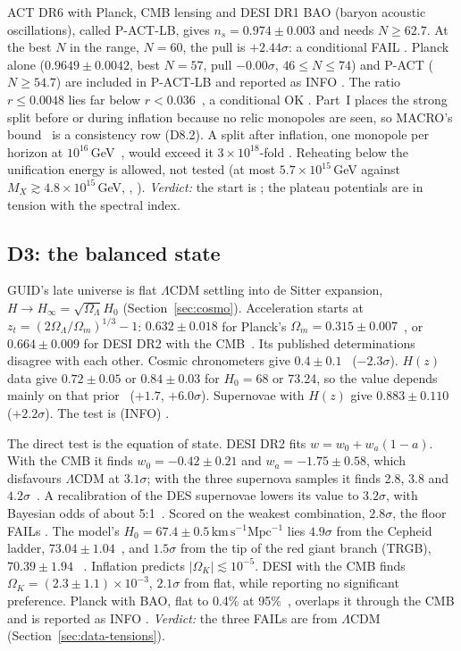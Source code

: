 ACT DR6 with Planck, CMB lensing and DESI DR1 BAO (baryon acoustic oscillations), called P-ACT-LB, gives $n_s=0.974\pm0.003$ and needs
$N\ge62.7$. At the best $N$ in the range, $N=60$, the pull is $+2.44\sigma$: a conditional FAIL . Planck alone ($0.9649\pm0.0042$,
best $N=57$, pull $-0.00\sigma$, $46\le N\le74$) and P-ACT ($N\ge54.7$) are included in P-ACT-LB and reported as INFO .
The ratio $r\le0.0048$ lies far below $r<0.036$~\cite{bk18}, a conditional OK . Part~I places the strong split before or
during inflation because no relic monopoles are seen, so MACRO's bound~\cite{macro} is a consistency row (D8.2). A split after inflation, one
monopole per horizon at $10^{16}$\,GeV~\cite{preskill}, would exceed it $3\times10^{18}$-fold . Reheating below the
unification energy is allowed, not tested (at most $5.7\times10^{15}$\,GeV against $M_X\gtrsim4.8\times10^{15}$\,GeV, ,
). \emph{Verdict:} the start is ; the plateau potentials are in tension with the spectral index.

\subsection{D3: the balanced state}\label{sec:data-cosmo}

GUID's late universe is flat $\Lambda$CDM settling into de Sitter expansion, $H\to H_\infty=\sqrt{\Omega_\Lambda}H_0$ (Section~\ref{sec:cosmo}).
Acceleration starts at $z_t=(2\Omega_\Lambda/\Omega_m)^{1/3}-1$: $0.632\pm0.018$ for Planck's $\Omega_m=0.315\pm0.007$~\cite{planck18}, or
$0.664\pm0.009$ for DESI DR2 with the CMB~\cite{desi2}. Its published determinations disagree with each other. Cosmic
chronometers give $0.4\pm0.1$~\cite{moresco2016} ($-2.3\sigma$). $H(z)$ data give $0.72\pm0.05$ or $0.84\pm0.03$ for $H_0=68$ or 73.24, so
the value depends mainly on that prior~\cite{farooq2017} ($+1.7$, $+6.0\sigma$). Supernovae with $H(z)$ give $0.883\pm0.110$~\cite{jesus2018}
($+2.2\sigma$). The test is  (INFO) .

The direct test is the equation of state. DESI DR2 fits $w=w_0+w_a(1-a)$. With the CMB it finds $w_0=-0.42\pm0.21$ and $w_a=-1.75\pm0.58$,
which disfavours $\Lambda$CDM at $3.1\sigma$; with the three supernova samples it finds 2.8, 3.8 and $4.2\sigma$~\cite{desi2}. A
recalibration of the DES supernovae lowers its value to $3.2\sigma$, with Bayesian odds of about 5:1~\cite{popovic2025}. Scored on the weakest
combination, $2.8\sigma$, the floor FAILs . The model's $H_0=67.4\pm0.5\,\mathrm{km\,s^{-1}Mpc^{-1}}$ lies $4.9\sigma$ from the
Cepheid ladder, $73.04\pm1.04$~\cite{riess2022}, and $1.5\sigma$ from the tip of the red giant branch (TRGB),
$70.39\pm1.94$~\cite{freedman2025} . Inflation predicts $|\Omega_K|\lesssim10^{-5}$. DESI with the CMB finds
$\Omega_K=(2.3\pm1.1)\times10^{-3}$, $2.1\sigma$ from flat, while reporting no significant preference. Planck with BAO, flat to 0.4\% at
95\%~\cite{planck2020x}, overlaps it through the CMB and is reported as INFO . \emph{Verdict:} the three FAILs are
 from $\Lambda$CDM (Section~\ref{sec:data-tensions}).

